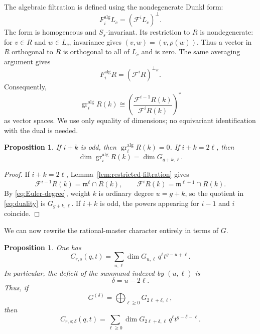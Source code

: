 \documentclass[11pt]{article}
\newtheorem{proposition}[theorem]{Proposition}
\newcommand{\gr}{\operatorname{gr}}
\newcommand{\alg}{\mathrm{alg}}
\begin{document}
The algebraic filtration is defined using the nondegenerate Dunkl
form:
\begin{equation}\label{eq:orthogonal-filtration}
 F_i^{\alg}L_c=(\mathcal F^iL_c)^\perp.
\end{equation}
The form is homogeneous and $S_s$-invariant.  Its restriction to $R$
is nondegenerate: for $v\in R$ and $w\in L_c$, invariance gives
$(v,w)=(v,\rho(w))$.  Thus a vector in $R$ orthogonal to $R$ is
orthogonal to all of $L_c$ and is zero.  The same averaging argument
gives
\[
 F_i^{\alg}R=(\mathcal F^iR)^{\perp_R}.
\]
Consequently,
\begin{equation}\label{eq:duality}
 \gr_i^{\alg}R(k)
 \cong
 \left(
 \frac{\mathcal F^{i-1}R(k)}{\mathcal F^iR(k)}
 \right)^*
\end{equation}
as vector spaces.  We use only equality of dimensions; no equivariant
identification with the dual is needed.

\begin{proposition}\label{prop:gr-comparison}
If $i+k$ is odd, then $\gr_i^{\alg}R(k)=0$.  If
$i+k=2\ell$, then
\begin{equation}\label{eq:gr-comparison}
 \dim\gr_i^{\alg}R(k)=\dim G_{g+k,\ell}.
\end{equation}
\end{proposition}

\begin{proof}
If $i+k=2\ell$, Lemma~\ref{lem:restricted-filtration} gives
\[
 \mathcal F^{i-1}R(k)=\mathfrak m^\ell\cap R(k),
 \qquad
 \mathcal F^iR(k)=\mathfrak m^{\ell+1}\cap R(k).
\]
By \eqref{eq:Euler-degree}, weight $k$ is ordinary degree $u=g+k$,
so the quotient in \eqref{eq:duality} is $G_{g+k,\ell}$.  If $i+k$
is odd, the powers appearing for $i-1$ and $i$ coincide.
\end{proof}

We can now rewrite the rational-master character entirely in terms of
$G$.

\begin{proposition}\label{prop:Catalan-G-character}
One has
\begin{equation}\label{eq:Catalan-G-character}
 C_{r,s}(q,t)
 =\sum_{u,\ell}\dim G_{u,\ell}\,
 q^\ell t^{g-u+\ell}.
\end{equation}
In particular, the deficit of the summand indexed by $(u,\ell)$ is
\begin{equation}\label{eq:deficit-u-ell}
 \delta=u-2\ell.
\end{equation}
Thus, if
\begin{equation}\label{eq:G-delta}
 G^{(\delta)}
 =\bigoplus_{\ell\geq0}G_{2\ell+\delta,\ell},
\end{equation}
then
\begin{equation}\label{eq:deficit-character}
 C_{r,s;\delta}(q,t)
 =\sum_{\ell\geq0}
 \dim G_{2\ell+\delta,\ell}\,
 q^\ell t^{g-\delta-\ell}.
\end{equation}
\end{proposition}
\end{document}
